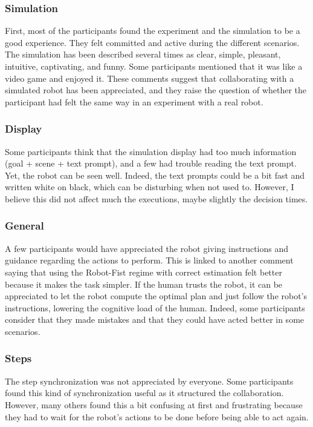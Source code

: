 \subsubsection{Simulation}
First, most of the participants found the experiment and the simulation to be a good experience. They felt committed and active during the different scenarios. 
The simulation has been described several times as clear, simple, pleasant, intuitive, captivating, and funny. 
Some participants mentioned that it was like a video game and enjoyed it. 
These comments suggest that collaborating with a simulated robot has been appreciated, and they raise the question of whether the participant had felt the same way in an experiment with a real robot. 

\subsubsection{Display}
Some participants think that the simulation display had too much information (goal + scene + text prompt), and a few had trouble reading the text prompt. Yet, the robot can be seen well. Indeed, the text prompts could be a bit fast and written white on black, which can be disturbing when not used to. However, I believe this did not affect much the executions, maybe slightly the decision times. 

\subsubsection{General}
A few participants would have appreciated the robot giving instructions and guidance regarding the actions to perform. This is linked to another comment saying that using the Robot-Fist regime with correct estimation felt better because it makes the task simpler. If the human trusts the robot, it can be appreciated to let the robot compute the optimal plan and just follow the robot's instructions, lowering the cognitive load of the human. Indeed, some participants consider that they made mistakes and that they could have acted better in some scenarios. 

\subsubsection{Steps}
The step synchronization was not appreciated by everyone. Some participants found this kind of synchronization useful as it structured the collaboration. However, many others found this a bit confusing at first and frustrating because they had to wait for the robot's actions to be done before being able to act again.

